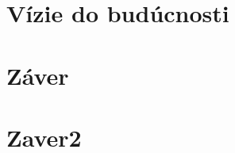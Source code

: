 \documentclass[10pt,twoside,slovak,a4paper]{coursepaper}
\begin{document}
\section{Vízie do budúcnosti} \label{Vízie do budúcnosti}




\section{Záver} \label{zaver} %



\section{Zaver2} \label{zaver 2}







\end{document}

